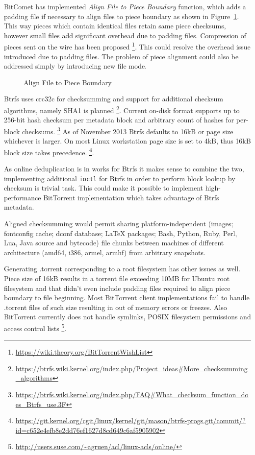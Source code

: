 \documentclass[a4paper,11pt]{kth-mag}
\begin{document}
BitComet has implemented \emph{Align File to Piece Boundary} function,
which adds a padding file if necessary to align files to piece boundary
as shown in Figure~\ref{fig:torrent-multifile-aligned}.
This way pieces which contain identical files retain same piece checksums,
however small files add significant overhead due to padding files.
Compression of pieces sent on the wire has been proposed
\footnote{\url{https://wiki.theory.org/BitTorrentWishList}}.
This could resolve the overhead issue introduced due to padding files.
The problem of piece alignment could also be addressed
simply by introducing new file mode.

\begin{figure}[!htb]
\centering
\scalebox{0.35}{}
\caption{Align File to Piece Boundary}
\label{fig:torrent-multifile-aligned}
\end{figure}


Btrfs uses crc32c for checksumming and support for additional
checksum algorithms, namely SHA1 is planned
\footnote{\url{https://btrfs.wiki.kernel.org/index.php/Project_ideas\#More_checksumming_algorithms}}.
Current on-disk format supports up to 256-bit hash checksum per
metadata block and arbitrary count of hashes for per-block checksums.
\footnote{\url{https://btrfs.wiki.kernel.org/index.php/FAQ\#What_checksum_function_does_Btrfs_use.3F}}
As of November 2013 Btrfs defaults to 16kB or page size
whichever is larger.
On most Linux workstation page size is set to 4kB, thus 16kB block
size takes precedence.
\footnote{\url{https://git.kernel.org/cgit/linux/kernel/git/mason/btrfs-progs.git/commit/?id=c652e4efb8e2dd76ef1627d8cd649c6af5905902}}.

As online deduplication is in works for Btrfs it makes sense to
combine the two, implementing additional \texttt{ioctl} for Btrfs in
order to perform block lookup by checksum is trivial task.
This could make it possible to implement high-performance
BitTorrent implementation which takes advantage of Btrfs metadata.

Aligned checksumming would permit sharing platform-independent
(images; fontconfig cache; dconf database; LaTeX packages;
Bash, Python, Ruby, Perl, Lua, Java source and bytecode)
file chunks between machines of different architecture (amd64, i386, armel, armhf)
from arbitrary snapshots.

Generating .torrent corresponding to a root filesystem
has other issues as well.
Piece size of 16kB results in a torrent file
exceeding 10MB for Ubuntu root filesystem and that didn't even
include padding files required to align piece boundary to file beginning.
Most BitTorrent client implementations fail to handle .torrent
files of such size resulting in out of memory errors or freezes.
Also BitTorrent currently does not handle symlinks,
POSIX filesystem permissions and access control lists
\footnote{\url{http://users.suse.com/~agruen/acl/linux-acls/online/}}.
\end{document}
